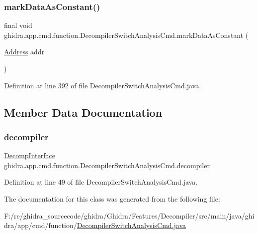 \subsubsection{\texorpdfstring{markDataAsConstant()}{markDataAsConstant()}}
{\footnotesize\ttfamily final void ghidra.\+app.\+cmd.\+function.\+Decompiler\+Switch\+Analysis\+Cmd.\+mark\+Data\+As\+Constant (\begin{DoxyParamCaption}\item[{\mbox{\hyperlink{class_address}{Address}}}]{addr }\end{DoxyParamCaption})\hspace{0.3cm}{\ttfamily [inline]}}



Definition at line 392 of file Decompiler\+Switch\+Analysis\+Cmd.\+java.



\subsection{Member Data Documentation}
\mbox{\label{classghidra_1_1app_1_1cmd_1_1function_1_1_decompiler_switch_analysis_cmd_a00027bad760619ae566f463a55a1cefd}} 
\subsubsection{\texorpdfstring{decompiler}{decompiler}}
{\footnotesize\ttfamily \mbox{\hyperlink{classghidra_1_1app_1_1decompiler_1_1_decomp_interface}{Decomp\+Interface}} ghidra.\+app.\+cmd.\+function.\+Decompiler\+Switch\+Analysis\+Cmd.\+decompiler\hspace{0.3cm}{\ttfamily [protected]}}



Definition at line 49 of file Decompiler\+Switch\+Analysis\+Cmd.\+java.



The documentation for this class was generated from the following file\+:\begin{DoxyCompactItemize}
\item 
F\+:/re/ghidra\+\_\+sourcecode/ghidra/\+Ghidra/\+Features/\+Decompiler/src/main/java/ghidra/app/cmd/function/\mbox{\hyperlink{_decompiler_switch_analysis_cmd_8java}{Decompiler\+Switch\+Analysis\+Cmd.\+java}}\end{DoxyCompactItemize}
